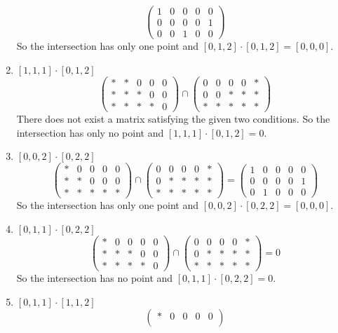 \documentclass[letterpaper, 12pt]{article}
\begin{document}
\begin{solution}
\begin{enumerate}[(1)]
\[\begin{pmatrix}
   1&0&0&0&0\\ 
   0&0&0&0&1\\ 
   0&0&1&0&0
\end{pmatrix}\]
So the intersection has only one point and \([0,1,2]\cdot [0,1,2]=[0,0,0]\).
\item \([1,1,1]\cdot [0,1,2]\)
\[\begin{pmatrix}
   *&*&0&0&0\\ 
   *&*&*&0&0\\
   *&*&*&*&0
\end{pmatrix}\cap \begin{pmatrix}
   0&0&0&0&*\\
   0&0&*&*&*\\ 
   *&*&*&*&*
\end{pmatrix}\]
There does not exist a matrix satisfying the given two conditions. So the intersection has only no point and \([1,1,1]\cdot [0,1,2]=0\).
\item \([0,0,2]\cdot [0,2,2]\)
\[\begin{pmatrix}
   *&0&0&0&0\\ 
   *&*&0&0&0\\
   *&*&*&*&*
\end{pmatrix}\cap \begin{pmatrix}
   0&0&0&0&*\\
   0&*&*&*&*\\ 
   *&*&*&*&*
\end{pmatrix}=\begin{pmatrix}
   1&0&0&0&0\\ 
   0&0&0&0&1\\ 
   0&1&0&0&0
\end{pmatrix}\]
So the intersection has only one point and \([0,0,2]\cdot [0,2,2]=[0,0,0]\).
\item \([0,1,1]\cdot [0,2,2]\)
\[\begin{pmatrix}
   *&0&0&0&0\\ 
   *&*&*&0&0\\
   *&*&*&*&0
\end{pmatrix}\cap \begin{pmatrix}
   0&0&0&0&*\\
   0&*&*&*&*\\ 
   *&*&*&*&*
\end{pmatrix}=0\]
So the intersection has no point and \([0,1,1]\cdot [0,2,2]=0\).
\item \([0,1,1]\cdot [1,1,2]\)
\[\begin{pmatrix}
   *&0&0&0&0\\ 

\end{pmatrix}\]
\end{enumerate}
\end{solution}
\end{document}
